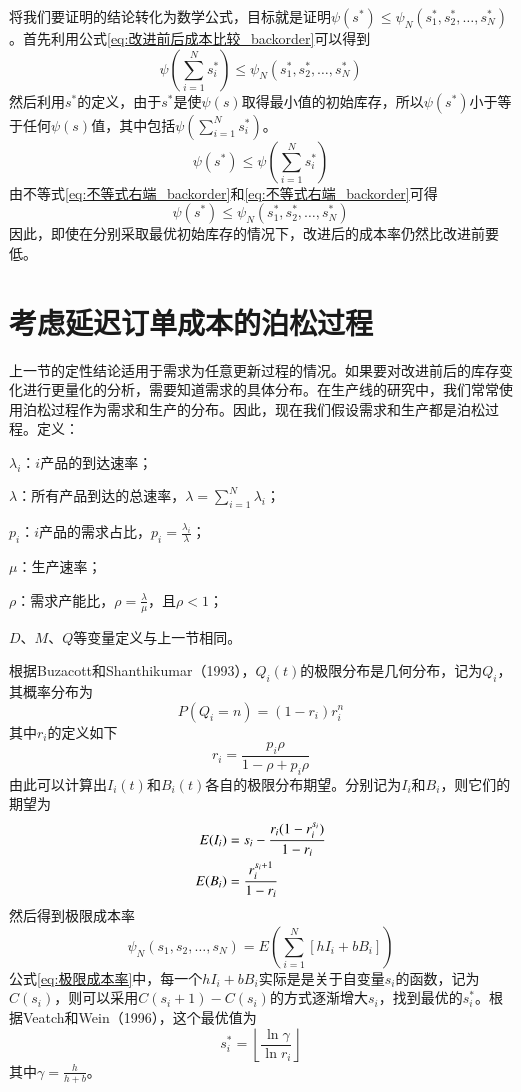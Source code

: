 将我们要证明的结论转化为数学公式，目标就是证明$\psi(s^*)\leq\psi_N(s_1^*,s_2^*,\ldots,s_N^*)$。首先利用公式\ref{eq:改进前后成本比较_backorder}可以得到
\begin{equation}
\psi(\sum_{i=1}^Ns_i^*) \leq \psi_N(s_1^*,s_2^*,\ldots,s_N^*)
\label{eq:不等式右端_backorder}
\end{equation}
然后利用$s^*$的定义，由于$s^*$是使$\psi(s)$取得最小值的初始库存，所以$\psi(s^*)$小于等于任何$\psi(s)$值，其中包括$\psi(\sum_{i=1}^Ns_i^*)$。
\begin{equation}
\psi(s^*) \leq \psi(\sum_{i=1}^Ns_i^*)
\label{eq:不等式右端_backorder}
\end{equation}
由不等式\ref{eq:不等式右端_backorder}和\ref{eq:不等式右端_backorder}可得
\[
\psi(s^*) \leq \psi_N(s_1^*,s_2^*,\ldots,s_N^*)
\]
因此，即使在分别采取最优初始库存的情况下，改进后的成本率仍然比改进前要低。









\section{考虑延迟订单成本的泊松过程}

上一节的定性结论适用于需求为任意更新过程的情况。如果要对改进前后的库存变化进行更量化的分析，需要知道需求的具体分布。在生产线的研究中，我们常常使用泊松过程作为需求和生产的分布。因此，现在我们假设需求和生产都是泊松过程。定义：

$\lambda_i$：$i$产品的到达速率；

$\lambda$：所有产品到达的总速率，$\lambda=\sum_{i=1}^N\lambda_i$；

$p_i$：$i$产品的需求占比，$p_i=\frac{\lambda_i}{\lambda}$；

$\mu$：生产速率；

$\rho$：需求产能比，$\rho = \frac{\lambda}{\mu}$，且$\rho<1$；

$D$、$M$、$Q$等变量定义与上一节相同。

根据Buzacott和Shanthikumar（1993）\cite{buzacott_stochastic_1993}，$Q_i(t)$的极限分布是几何分布，记为$Q_i$，其概率分布为
\[
P(Q_i=n)=(1-r_i)r_i^n
\]
其中$r_i$的定义如下
\[
r_i = \frac{p_i\rho}{1-\rho+p_i\rho}
\]
由此可以计算出$I_i(t)$和$B_i(t)$各自的极限分布期望。分别记为$I_i$和$B_i$，则它们的期望为
\begin{align}
E(I_i) &= s_i - \frac{r_i(1-r_i^{s_i})}{1-r_i} \notag\\
E(B_i) &= \frac{r_i^{s_i+1}}{1-r_i} \notag 
\end{align}
然后得到极限成本率
\begin{equation}
\psi_N(s_1,s_2,\ldots,s_N) = E\left(\sum_{i=1}^N[hI_i+bB_i]\right)
\label{eq:极限成本率}
\end{equation}
公式\ref{eq:极限成本率}中，每一个$hI_i+bB_i$实际是是关于自变量$s_i$的函数，记为$C(s_i)$，则可以采用$C(s_i+1)-C(s_i)$的方式逐渐增大$s_i$，找到最优的$s_i^*$。根据Veatch和Wein（1996）\cite{veatch_scheduling_1996}，这个最优值为
\begin{equation}
s_i^* = \left\lfloor\frac{\ln\gamma}{\ln r_i}\right\rfloor
\label{eq:泊松分布下的最优初始库存_backorder}
\end{equation}
其中$\gamma=\frac{h}{h+b}$。

